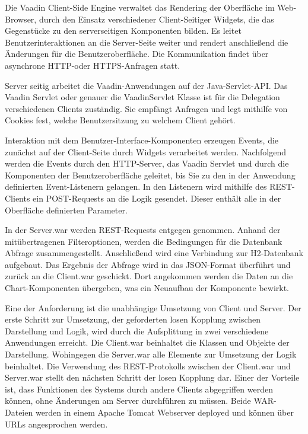 Die Vaadin Client-Side Engine verwaltet das Rendering der Oberfläche im Web-Browser, durch den Einsatz verschiedener Client-Seitiger Widgets, die das Gegenstücke zu den serverseitigen Komponenten bilden. Es leitet Benutzerinteraktionen an die Server-Seite weiter und rendert anschließend die Änderungen für die Benutzeroberfläche. Die Kommunikation findet über asynchrone HTTP-oder HTTPS-Anfragen statt.

Server seitig arbeitet die Vaadin-Anwendungen auf der Java-Servlet-API. Das Vaadin Servlet oder genauer die VaadinServlet Klasse ist für die Delegation verschiedenen Clients zuständig. Sie empfängt Anfragen und legt mithilfe von Cookies fest, welche Benutzersitzung zu welchem Client gehört.

Interaktion mit dem Benutzer-Interface-Komponenten erzeugen Events, die zunächst auf der Client-Seite durch Widgets verarbeitet werden. Nachfolgend werden die Events durch den HTTP-Server, das Vaadin Servlet und durch die Komponenten der Benutzeroberfläche geleitet, bis Sie zu den in der Anwendung definierten Event-Listenern gelangen. In den Listenern wird mithilfe des REST-Clients ein POST-Requests an die Logik gesendet. Dieser enthält alle in der Oberfläche definierten Parameter. 

In der Server.war werden REST-Requests entgegen genommen. Anhand der mitübertragenen Filteroptionen, werden die Bedingungen für die Datenbank Abfrage zusammengestellt. Anschließend wird eine Verbindung zur H2-Datenbank aufgebaut. Das Ergebnis der Abfrage wird in das JSON-Format überführt und zurück an die Client.war geschickt. Dort angekommen werden die Daten an die Chart-Komponenten übergeben, was ein Neuaufbau der Komponente bewirkt.      

Eine der Anforderung ist die unabhängige Umsetzung von Client und Server. Der erste Schritt zur Umsetzung, der geforderten losen Kopplung zwischen Darstellung und Logik, wird durch die Aufsplittung in zwei verschiedene Anwendungen erreicht. Die Client.war beinhaltet die Klassen und Objekte der Darstellung. Wohingegen die Server.war alle Elemente zur Umsetzung der Logik beinhaltet. Die Verwendung des REST-Protokolls zwischen der Client.war und Server.war stellt den nächsten Schritt der losen Kopplung dar. Einer der Vorteile ist, dass Funktionen des Systems durch andere Clients abgegriffen werden können, ohne Änderungen am Server durchführen zu müssen. Beide WAR-Dateien werden in einem Apache Tomcat Webserver deployed und können über URLs angesprochen werden.

